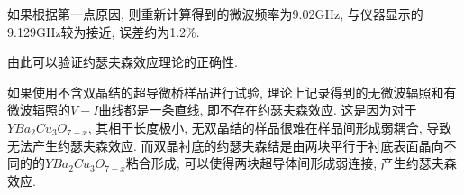 \documentclass[font=default]{mpltx}
\newcommand{\note}[1]{{\color{gray}#1}}
\newcommand*\cs[1]{\texttt{\textbackslash #1}}
\newcommand*\env[1]{\textit{\texttt{#1}}}
\newcommand*\code[1]{\texttt{#1}}
\begin{document}
  如果根据第一点原因, 则重新计算得到的微波频率为9.02GHz, 与仪器显示的9.129GHz较为接近, 误差约为1.2\%. 
  \par
  由此可以验证约瑟夫森效应理论的正确性.
  \par
  如果使用不含双晶结的超导微桥样品进行试验, 理论上记录得到的无微波辐照和有微波辐照的$V-I$曲线都是一条直线, 即不存在约瑟夫森效应.
  这是因为对于$YBa_2Cu_3O_{7-x}$, 其相干长度极小, 无双晶结的样品很难在样品间形成弱耦合, 导致无法产生约瑟夫森效应. 
  而双晶衬底的约瑟夫森结是由两块平行于衬底表面晶向不同的的$YBa_2Cu_3O_{7-x}$粘合形成, 可以使得两块超导体间形成弱连接, 产生约瑟夫森效应.








\end{document}
